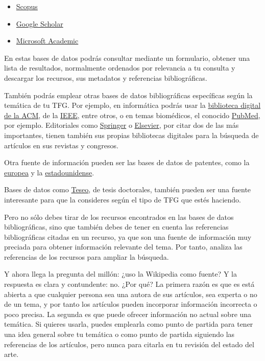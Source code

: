 \begin{itemize}
    \item \href{www.scopus.com}{Scopus}
    \item \href{https://scholar.google.es}{Google Scholar}
    \item \href{https://www.microsoft.com/en-us/research/project/academic}{Microsoft Academic}
\end{itemize}

En estas bases de datos podrás consultar mediante un formulario, obtener una lista de resultados, normalmente ordenados por relevancia a tu consulta y descargar los recursos, sus metadatos y referencias bibliográficas.

También podrás emplear otras bases de datos bibliográficas específicas según la temática de tu TFG. Por ejemplo, en informática podrás usar la \href{https://dl.acm.org}{biblioteca digital de la ACM}, de la \href{https://ieeexplore.ieee.org}{IEEE}, entre otros, o en temas biomédicos, el conocido \href{https://pubmed.ncbi.nlm.nih.gov/}{PubMed}, por ejemplo. Editoriales como \href{https://link.springer.com}{Springer} o \href{https://www.sciencedirect.com}{Elsevier}, por citar dos de las más importantes, tienen también sus propias bibliotecas digitales para la búsqueda de artículos en sus revistas y congresos.

Otra fuente de información pueden ser las bases de datos de patentes, como la \href{https://worldwide.espacenet.com}{europea} y la \href{https://ppubs.uspto.gov/pubwebapp/static/pages/landing.html}{estadounidense}.

Bases de datos como \href{https://www.educacion.gob.es/teseo}{Teseo}, de tesis doctorales, también pueden ser una fuente interesante para que la consideres según el tipo de TFG que estés haciendo.

Pero no sólo debes tirar de los recursos encontrados en las bases de datos bibliográficas, sino que también debes de tener en cuenta las referencias bibliográficas citadas en un recurso, ya que son una fuente de información muy preciada para obtener información relevante del tema. Por tanto, analiza las referencias de los recursos para ampliar la búsqueda.

Y ahora llega la pregunta del millón: ¿uso la Wikipedia como fuente? Y la respuesta es clara y contundente: no. ¿Por qué? La primera razón es que es está abierta a que cualquier persona sea una autora de sus artículos, sea experta o no de un tema, y por tanto los artículos pueden incorporar información incorrecta o poco precisa. La segunda es que puede ofrecer información no actual sobre una temática. Si quieres usarla, puedes emplearla como punto de partida para tener una idea general sobre tu temática o como punto de partida siguiendo las referencias de los artículos, pero nunca para citarla en tu revisión del estado del arte.

